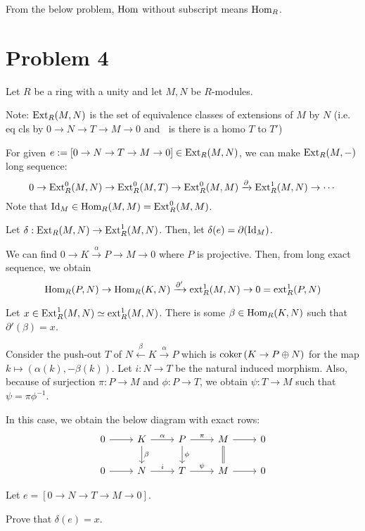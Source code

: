 From the below problem, \(\textnormal{Hom}\) without subscript means \(\textnormal{Hom}_R\).

\section*{Problem 4}

Let \(R\) be a ring with a unity and
let \(M, N\) be \(R\)-modules.

Note:
\(\textnormal{Ext}_R(M, N)\) is the set of equivalence classes of extensions of \(M\) by \(N\) (i.e. eq cls by \(0 \to N \to T \to M \to 0\) and \(~\) is there is a homo \(T\) to \(T'\))

For given \(e := [0 \to N \to T \to M \to 0] \in \textnormal{Ext}_R(M, N)\),
we can make \(\textnormal{Ext}_R(M, -)\) long sequence:
\[0 \to \textnormal{Ext}_R^0(M, N) \to \textnormal{Ext}_R^0(M, T) \to \textnormal{Ext}_R^0(M, M) \xrightarrow{\partial} \textnormal{Ext}_R^1(M, N) \to \cdots\]
Note that \(\textnormal{Id}_M \in \textnormal{Hom}_R(M, M) = \textnormal{Ext}_R^0(M, M)\).

Let \(\delta: \textnormal{Ext}_R(M, N) \to \textnormal{Ext}_R^1(M, N)\).
Then, let \(\delta(e) = \partial(\textnormal{Id}_M)\).

We can find \(0 \to K \xrightarrow{\alpha} P \to M \to 0\)
where \(P\) is projective.
Then, from long exact sequence, we obtain
\[\textnormal{Hom}_R(P, N) \to \textnormal{Hom}_R(K, N) \xrightarrow{\partial'} \textnormal{ext}_R^1(M, N) \to 0 = \textnormal{ext}_R^1(P, N)\]

Let \(x \in \textnormal{Ext}_R^1(M, N) \simeq \textnormal{ext}_R^1(M, N)\).
There is some \(\beta \in \textnormal{Hom}_R(K, N)\) such that \(\partial'(\beta) = x\).

Consider the push-out \(T\) of \(N \xleftarrow{\beta} K \xrightarrow{\alpha} P\)
which is \(\textnormal{coker}\,(K \to P \oplus N)\) for the map \(k \mapsto (\alpha(k), -\beta(k))\).
Let \(i: N \to T\) be the natural induced morphism.
Also, because of surjection \(\pi: P \to M\) and \(\phi: P \to T\), we obtain \(\psi: T \to M\) such that \(\psi = \pi\phi^{-1}\).

In this case, we obtain the below diagram with exact rows:
\[\begin{tikzcd}
  0 \ar{r} & K \ar["\beta"]{d} \ar["\alpha"]{r} & P \ar["\phi"]{d} \ar["\pi"]{r} & M \ar[equal]{d} \ar{r} & 0 \\
  0 \ar{r} & N \ar["i"]{r} & T \ar["\psi"]{r} & M \ar{r} & 0
\end{tikzcd}\]

Let \(e = [0 \to N \to T \to M \to 0]\).

Prove that \(\delta(e) = x\).

